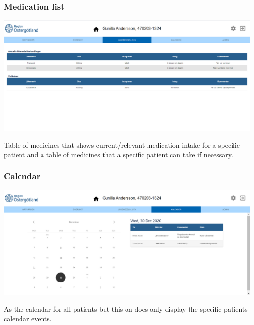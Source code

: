 \subsubsection{Medication list}
\begin{center}
    \includegraphics[width=\linewidth]{images/single_patient_medications_image.png}
    \label{fig:figures}
\end{center}
Table of medicines that shows current/relevant medication intake for a specific patient and a table of medicines that a specific patient can take if necessary.
\\

\subsubsection{Calendar}
\begin{center}
    \includegraphics[width=\linewidth]{images/single_patient_calendar_image.png}
    \label{fig:figures}
\end{center}
As the calendar for all patients but this on does only display the specific patients calendar events.
\\

